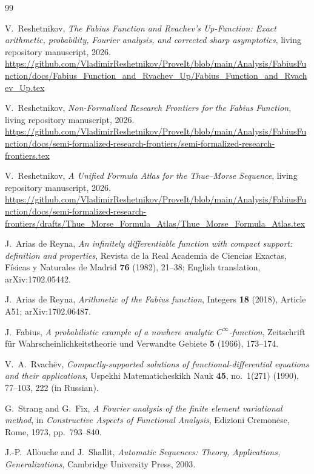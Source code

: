 \documentclass[11pt,oneside]{article}
\numberwithin{equation}{section}
\theoremstyle{definition}
\theoremstyle{remark}
\begin{document}
\begin{thebibliography}{99}

V.~Reshetnikov,
\emph{The Fabius Function and Rvachev's Up-Function: Exact arithmetic, probability, Fourier analysis, and corrected sharp asymptotics},
living repository manuscript, 2026.
\url{https://github.com/VladimirReshetnikov/ProveIt/blob/main/Analysis/FabiusFunction/docs/Fabius_Function_and_Rvachev_Up/Fabius_Function_and_Rvachev_Up.tex}

V.~Reshetnikov,
\emph{Non-Formalized Research Frontiers for the Fabius Function},
living repository manuscript, 2026.
\url{https://github.com/VladimirReshetnikov/ProveIt/blob/main/Analysis/FabiusFunction/docs/semi-formalized-research-frontiers/semi-formalized-research-frontiers.tex}

V.~Reshetnikov,
\emph{A Unified Formula Atlas for the Thue--Morse Sequence},
living repository manuscript, 2026.
\url{https://github.com/VladimirReshetnikov/ProveIt/blob/main/Analysis/FabiusFunction/docs/semi-formalized-research-frontiers/drafts/Thue_Morse_Formula_Atlas/Thue_Morse_Formula_Atlas.tex}

J.~Arias de Reyna,
\emph{An infinitely differentiable function with compact support: definition and properties},
Revista de la Real Academia de Ciencias Exactas, F\'isicas y Naturales de Madrid
\textbf{76} (1982), 21--38; English translation, arXiv:1702.05442.

J.~Arias de Reyna,
\emph{Arithmetic of the Fabius function},
Integers \textbf{18} (2018), Article A51; arXiv:1702.06487.

J.~Fabius,
\emph{A probabilistic example of a nowhere analytic $C^\infty$-function},
Zeitschrift f\"ur Wahrscheinlichkeitstheorie und Verwandte Gebiete
\textbf{5} (1966), 173--174.

V.~A.~Rvach\"ev,
\emph{Compactly-supported solutions of functional-differential equations and their applications},
Uspekhi Matematicheskikh Nauk \textbf{45}, no.~1(271) (1990), 77--103, 222 (in Russian).

G.~Strang and G.~Fix,
\emph{A Fourier analysis of the finite element variational method},
in \emph{Constructive Aspects of Functional Analysis}, Edizioni Cremonese, Rome, 1973, pp.~793--840.

J.-P.~Allouche and J.~Shallit,
\emph{Automatic Sequences: Theory, Applications, Generalizations},
Cambridge University Press, 2003.


\end{thebibliography}
\end{document}
